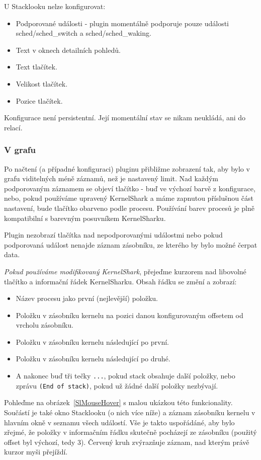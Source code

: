 U Stacklooku nelze konfigurovat:
\begin{itemize}
\item Podporované události - plugin momentálně podporuje pouze události sched/sched\_switch a sched/sched\_waking.
\item Text v oknech detailních pohledů.
\item Text tlačítek.
\item Velikost tlačítek.
\item Pozice tlačítek.
\end{itemize}

Konfigurace není persistentní. Její momentální stav se nikam neukládá, ani do relací.

\subsubsection{V grafu}

Po načtení (a případné konfiguraci) pluginu přibližme zobrazení tak, aby bylo v grafu viditelných méně záznamů, než je nastavený limit. Nad každým podporovaným záznamem se objeví tlačítko - buď ve výchozí barvě z konfigurace, nebo, pokud používáme upravený KernelShark a máme zapnutou příslušnou část nastavení, bude tlačítko obarveno podle procesu. Používání barev procesů je plně kompatibilní s barevným posuvníkem KernelSharku.

Plugin nezobrazí tlačítka nad nepodporovanými událostmi nebo pokud podporovaná událost nenajde záznam zásobníku, ze kterého by bylo možné čerpat data.

\emph{Pokud používáme modifikovaný KernelShark}, přejeďme kurzorem nad libovolné tlačítko a informační řádek KernelSharku. Obsah řádku se změní a zobrazí:
\begin{itemize}
  \item Název procesu jako první (nejlevější) položku.
  \item Položku v zásobníku kernelu na pozici danou konfigurovaným offsetem od vrcholu zásobníku.
  \item Položku v zásobníku kernelu následující po první.
  \item Položku v zásobníku kernelu následující po druhé.
  \item A nakonec buď tři tečky \texttt{...}, pokud stack obsahuje další položky, nebo zprávu \texttt{(End of stack)}, pokud už žádné další položky nezbývají.
\end{itemize}

Pohleďme na obrázek~\ref{SlMouseHover} s malou ukázkou této funkcionality. Součástí je také okno Stacklooku (o nich více níže) a záznam zásobníku kernelu v hlavním okně v seznamu všech událostí. Vše je takto uspořádáné, aby bylo zřejmé, že položky v informačním řádku skutečně pocházejí ze zásobníku (použitý offset byl výchozí, tedy 3). Červený kruh zvýrazňuje záznam, nad kterým právě kurzor myši přejíždí.


